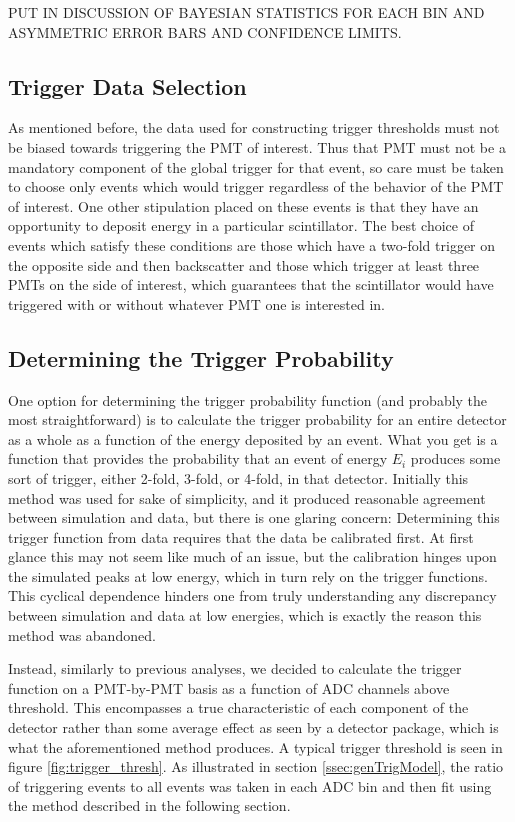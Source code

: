 PUT IN DISCUSSION OF BAYESIAN STATISTICS FOR EACH BIN AND ASYMMETRIC ERROR BARS
AND CONFIDENCE LIMITS.

\subsection{Trigger Data Selection}
As mentioned before, the data used for constructing trigger thresholds must not be 
biased towards triggering the PMT of interest. Thus that PMT must not be a mandatory 
component of the global trigger for that event, so care must be taken to choose only 
events which would trigger regardless of the behavior of the PMT of interest. One
other stipulation placed on these events is that they have an opportunity to 
deposit energy in a particular scintillator. The best choice of events which 
satisfy these conditions are those which have a two-fold trigger on the opposite side 
and then backscatter and those which trigger at least three PMTs on the side of 
interest, which guarantees that the scintillator would have triggered with or without 
whatever PMT one is interested in.	

\subsection{Determining the Trigger Probability}
One option for determining the trigger probability function (and probably the 
most straightforward) is to calculate the trigger probability for an entire detector as 
a whole as a function of the energy deposited by an event. What you get is a 
function that provides the probability that an event of energy $ E_i $ 
produces some sort of trigger, either 2-fold, 3-fold, or 4-fold, in that 
detector. Initially this method was used for sake of simplicity, and it produced 
reasonable agreement between simulation and data, but there is one 
glaring concern: Determining this trigger function from data requires that the data be 
calibrated first. At first glance this may not seem like much of an issue, but the 
calibration hinges upon the 
simulated peaks at low energy, which in turn rely on the trigger functions. This 
cyclical dependence hinders one from truly understanding any discrepancy between 
simulation and data at low energies, which is exactly the reason this method was 
abandoned.  

Instead, similarly to previous analyses, we decided to calculate the trigger
function on a PMT-by-PMT basis as a function of ADC channels above threshold. This
encompasses a true characteristic of each component of the detector rather than some
average effect as seen by a detector package, which is what the aforementioned 
method produces. A typical trigger threshold is seen in figure \ref{fig:trigger_thresh}.
As illustrated in section \ref{ssec:genTrigModel}, the ratio of triggering events
to all events was taken in each ADC bin and then fit using the method described
in the following section.
  

